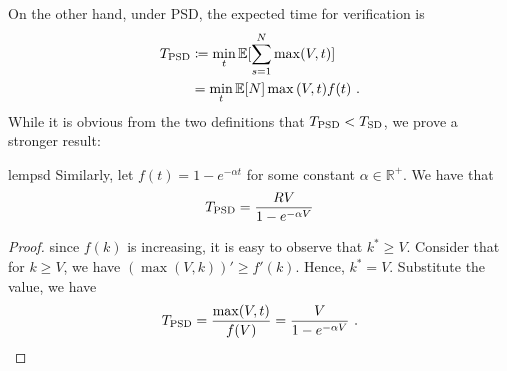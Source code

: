 On the other hand, under PSD, the expected time for verification is
\begin{equation*}
\begin{aligned}
\textstyle T_{\textnormal{\text{PSD}}} &\coloneqq \min_t \mathbb{E}[\sum_{s=1}^N\max(V, t)] \\ &= \min_t \mathbb{E}[N]\max{(V, t)}{f(t)}\ .
\end{aligned}
\end{equation*}
While it is obvious from the two definitions that $T_{\textnormal{\text{PSD}}} < T_{\textnormal{\text{SD}}}$, we prove a stronger result:
\begin{restatable}{lem}{psd}
    \label{prop:psd}
    Similarly, let $f(t) = 1 - e^{-\alpha t}$ for some constant $\alpha \in \mathbb{R}^+$. We have that
    \begin{equation*}
        T_{\textnormal{\text{PSD}}} = \frac{RV}{1-e^{-\alpha V}}
    \end{equation*}
\end{restatable}


\begin{proof}
    since $f(k)$ is increasing, it is easy to observe that $k^* \geq V$. Consider that for $k \geq V$, we have $(\max(V, k))' \geq f'(k)$. Hence, $k^* = V$. Substitute the value, we have
    \begin{equation*}
        T_{\textnormal{\text{PSD}}} = \frac{\max(V, t)}{f(V)} = \frac{V}{1-e^{-\alpha V}}\ . \qedhere 
    \end{equation*}
\end{proof}


